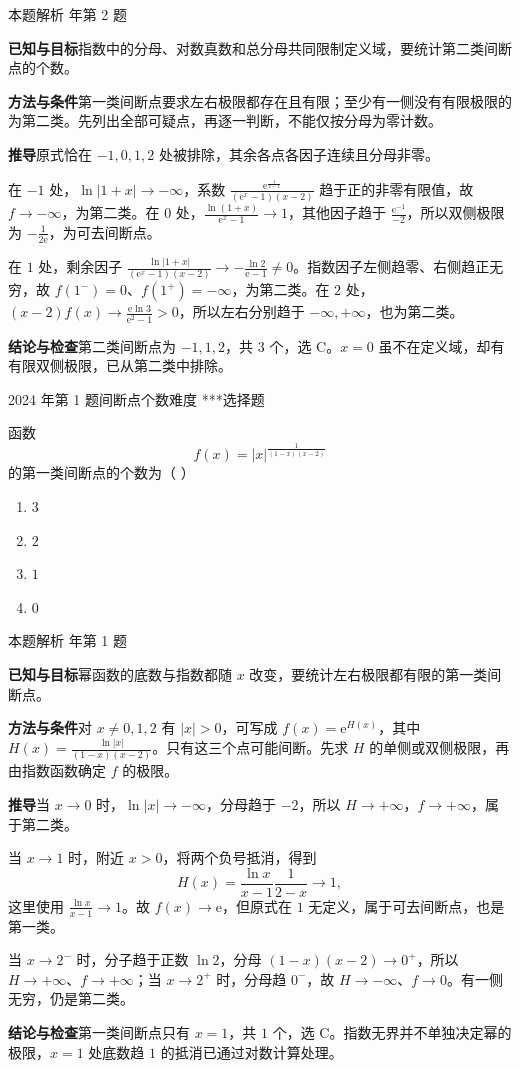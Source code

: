 \documentclass[UTF8,zihao=-4,fontset=fandol]{ctexart}
\newenvironment{abcd}{\begin{enumerate}[label=\textup{(\Alph*)},leftmargin=2.3em,itemsep=1pt,topsep=4pt,parsep=1pt]}{\end{enumerate}}
\newcommand{\choices}[4]{%
  \begin{abcd}
    \item #1
    \item #2
    \item #3
    \item #4
  \end{abcd}}
\newcounter{BankQuestion}
\newcommand{\QuestionPage}[7]{%
  \stepcounter{BankQuestion}%
  \par\noindent\begin{minipage}{\linewidth}
  \raggedright
  {\small\textcolor{black!60}{#3\quad #5\quad 难度 #7}\hfill\textcolor{accent}{#2}}\par\smallskip}
\newcommand{\QuestionEnd}{\end{minipage}\par\medskip}
\newcommand{\QuestionPage}[7]{%
  \clearpage
  \stepcounter{BankQuestion}%
  {\small\textcolor{accent}{#1\hfill #2}}\par\medskip
  {\small\textcolor{black!60}{#3\quad #5\quad 难度 #7\hfill \arabic{BankQuestion} / 234}}\par\vspace{9bp}}
\newcommand{\QuestionEnd}{}
\newenvironment{QuestionSolution}[1]{%
  \clearpage
  {\small\textcolor{black!60}{本题解析\quad #1}}\par\medskip
}{\par\clearpage}
\begin{document}
\begin{QuestionSolution}{2020 年第 2 题}
\textbf{已知与目标}\quad 指数中的分母、对数真数和总分母共同限制定义域，要统计第二类间断点的个数。

\textbf{方法与条件}\quad 第一类间断点要求左右极限都存在且有限；至少有一侧没有有限极限的为第二类。先列出全部可疑点，再逐一判断，不能仅按分母为零计数。

\textbf{推导}\quad 原式恰在 \(-1,0,1,2\) 处被排除，其余各点各因子连续且分母非零。

在 \(-1\) 处，\(\ln|1+x|\to-\infty\)，系数 \(\frac{\mathrm e^{\frac{1}{x-1}}}{(\mathrm e^x-1)(x-2)}\) 趋于正的非零有限值，故 \(f\to-\infty\)，为第二类。在 \(0\) 处，\(\frac{\ln(1+x)}{\mathrm e^x-1}\to1\)，其他因子趋于 \(\frac{\mathrm e^{-1}}{-2}\)，所以双侧极限为 \(-\frac{1}{2\mathrm e}\)，为可去间断点。

在 \(1\) 处，剩余因子 \(\frac{\ln|1+x|}{(\mathrm e^x-1)(x-2)}\to-\frac{\ln2}{\mathrm e-1}\ne0\)。指数因子左侧趋零、右侧趋正无穷，故 \(f(1^-)=0\)、\(f(1^+)=-\infty\)，为第二类。在 \(2\) 处，\((x-2)f(x)\to\frac{\mathrm e\ln3}{\mathrm e^2-1}>0\)，所以左右分别趋于 \(-\infty,+\infty\)，也为第二类。

\textbf{结论与检查}\quad 第二类间断点为 \(-1,1,2\)，共 \(\boxed{3}\) 个，选 C。\(x=0\) 虽不在定义域，却有有限双侧极限，已从第二类中排除。
\end{QuestionSolution}

\QuestionPage{1.5 连续函数}{选择题}{2024 年第 1 题}{1}{间断点个数}{047 / 234}{***}
函数
\[f(x)=|x|^{\frac{1}{(1-x)(x-2)}}
\]
的第一类间断点的个数为（ ）
\choices{\(3\)}{\(2\)}{\(1\)}{\(0\)}
\QuestionEnd

\begin{QuestionSolution}{2024 年第 1 题}
\textbf{已知与目标}\quad 幂函数的底数与指数都随 \(x\) 改变，要统计左右极限都有限的第一类间断点。

\textbf{方法与条件}\quad 对 \(x\ne0,1,2\) 有 \(|x|>0\)，可写成 \(f(x)=\mathrm e^{H(x)}\)，其中 \(H(x)=\frac{\ln|x|}{(1-x)(x-2)}\)。只有这三个点可能间断。先求 \(H\) 的单侧或双侧极限，再由指数函数确定 \(f\) 的极限。

\textbf{推导}\quad 当 \(x\to0\) 时，\(\ln|x|\to-\infty\)，分母趋于 \(-2\)，所以 \(H\to+\infty\)，\(f\to+\infty\)，属于第二类。

当 \(x\to1\) 时，附近 \(x>0\)，将两个负号抵消，得到
\[
H(x)=\frac{\ln x}{x-1}\frac{1}{2-x}\longrightarrow1,
\]
这里使用 \(\frac{\ln x}{x-1}\to1\)。故 \(f(x)\to\mathrm e\)，但原式在 \(1\) 无定义，属于可去间断点，也是第一类。

当 \(x\to2^-\) 时，分子趋于正数 \(\ln2\)，分母 \((1-x)(x-2)\to0^+\)，所以 \(H\to+\infty\)、\(f\to+\infty\)；当 \(x\to2^+\) 时，分母趋 \(0^-\)，故 \(H\to-\infty\)、\(f\to0\)。有一侧无穷，仍是第二类。

\textbf{结论与检查}\quad 第一类间断点只有 \(x=1\)，共 \(\boxed{1}\) 个，选 C。指数无界并不单独决定幂的极限，\(x=1\) 处底数趋 \(1\) 的抵消已通过对数计算处理。
\end{QuestionSolution}
\end{document}
